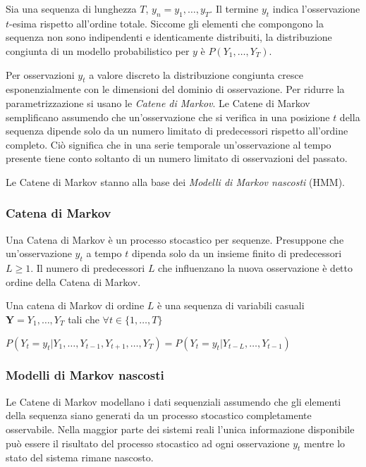 \documentclass[../main.tex]{subfiles}
\begin{document}
Sia una sequenza di lunghezza $T$, $ { y } _ { n } = y _ { 1 } , \dots , y _ { T }$. Il termine ${y} _ {t}$ indica l'osservazione $t$-esima rispetto all'ordine totale. Siccome gli elementi che compongono la sequenza non sono indipendenti e identicamente distribuiti, la distribuzione congiunta di un modello probabilistico per $y$ è $P \left( Y _ { 1 } , \ldots , Y _ { T } \right)$.

Per osservazioni ${y} _ {t}$ a valore discreto la distribuzione congiunta cresce esponenzialmente con le dimensioni del dominio di osservazione. Per ridurre la parametrizzazione si usano le \textit{Catene di Markov}. Le Catene di Markov semplificano assumendo che un'osservazione che si verifica in una posizione $t$ della sequenza dipende solo da un numero limitato di predecessori rispetto all'ordine completo.
Ciò significa che in una serie temporale un'osservazione al tempo presente tiene conto soltanto di un numero limitato di osservazioni del passato.

Le Catene di Markov stanno alla base dei \textit{Modelli di Markov nascosti} (HMM).

\subsubsection{Catena di Markov}
Una Catena di Markov è un processo stocastico per sequenze. Presuppone che un'osservazione ${y} _ {t}$ a tempo $t$ dipenda solo da un insieme finito di predecessori $L \geq 1$. Il numero di predecessori $L$ che influenzano la nuova osservazione è detto ordine della Catena di Markov.

Una catena di Markov di ordine $L$ è una sequenza di variabili casuali $\mathbf { Y } = Y _ { 1 } , \ldots , Y _ { T }$ tali che $\forall t \in \{ 1 , \ldots , T \}$

\begin{center}
				\begin{math}
								P \left( Y _ { t } = y _ { t } | Y _ { 1 } , \ldots , Y _ { t - 1 } , Y _ { t + 1 } , \ldots , Y _ { T } \right) = P \left( Y _ { t } = y _ { t } | Y _ { t - L } , \ldots , Y _ { t - 1 } \right)
				\end{math}
\end{center}

\subsubsection{Modelli di Markov nascosti}
Le Catene di Markov modellano i dati sequenziali assumendo che gli elementi della sequenza siano generati da un processo stocastico completamente osservabile. Nella maggior parte dei sistemi reali l'unica informazione disponibile può essere il risultato del processo stocastico ad ogni osservazione ${y} _ {t}$ mentre lo stato del sistema rimane nascosto. 
\end{document}
